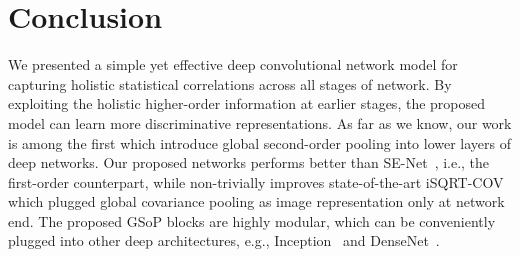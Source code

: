 \documentclass[10pt,twocolumn,letterpaper]{article}
\begin{document}
\section{Conclusion}

We presented a simple yet effective deep convolutional network model for  capturing holistic statistical correlations across all stages of network. By exploiting the holistic higher-order  information at earlier  stages, the proposed model can learn more discriminative   representations. As far as we know, our work is among the first which  introduce global second-order pooling  into lower layers of deep networks. Our proposed networks performs  better than  SE-Net~\cite{Hu_2018_CVPR_SE}, i.e., the first-order counterpart, while non-trivially improves state-of-the-art iSQRT-COV~\cite{Li_2018_CVPR} which plugged global covariance pooling as image representation  only at network end.  The proposed GSoP blocks are highly modular, which  can be conveniently  plugged into other deep architectures, e.g., Inception~\cite{Szegedy_2015_CVPR} and DenseNet~\cite{Huang_2017_CVPR}.

{\small


}
\end{document}
